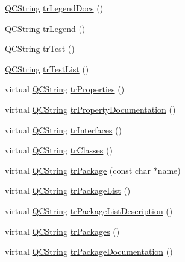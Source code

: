 \begin{DoxyCompactItemize}
\mbox{\hyperlink{class_q_c_string}{Q\+C\+String}} \mbox{\hyperlink{class_translator_polish_a0b2b7c31dea5cec7a2419404276e65f2}{tr\+Legend\+Docs}} ()
\item 
\mbox{\hyperlink{class_q_c_string}{Q\+C\+String}} \mbox{\hyperlink{class_translator_polish_aab45a1ee516e7e1bccfc3d583bfb4ab1}{tr\+Legend}} ()
\item 
\mbox{\hyperlink{class_q_c_string}{Q\+C\+String}} \mbox{\hyperlink{class_translator_polish_aad254fed5e66326eb597796325207be8}{tr\+Test}} ()
\item 
\mbox{\hyperlink{class_q_c_string}{Q\+C\+String}} \mbox{\hyperlink{class_translator_polish_ab08b331b46f12531653bd2933328c57a}{tr\+Test\+List}} ()
\item 
virtual \mbox{\hyperlink{class_q_c_string}{Q\+C\+String}} \mbox{\hyperlink{class_translator_polish_a6f0eb5ca63099a11f7117e427760efb7}{tr\+Properties}} ()
\item 
virtual \mbox{\hyperlink{class_q_c_string}{Q\+C\+String}} \mbox{\hyperlink{class_translator_polish_ab646ef6a01416499a16c0324f0174638}{tr\+Property\+Documentation}} ()
\item 
virtual \mbox{\hyperlink{class_q_c_string}{Q\+C\+String}} \mbox{\hyperlink{class_translator_polish_a9e7ec9037ad79c76607b29fc953bc6e5}{tr\+Interfaces}} ()
\item 
virtual \mbox{\hyperlink{class_q_c_string}{Q\+C\+String}} \mbox{\hyperlink{class_translator_polish_addab87a21d11341baa38eabe20b70507}{tr\+Classes}} ()
\item 
virtual \mbox{\hyperlink{class_q_c_string}{Q\+C\+String}} \mbox{\hyperlink{class_translator_polish_a90be77db4f73def98c3e2b462c505500}{tr\+Package}} (const char $\ast$name)
\item 
virtual \mbox{\hyperlink{class_q_c_string}{Q\+C\+String}} \mbox{\hyperlink{class_translator_polish_a73e66fde6e101c7206ad85184ae8550b}{tr\+Package\+List}} ()
\item 
virtual \mbox{\hyperlink{class_q_c_string}{Q\+C\+String}} \mbox{\hyperlink{class_translator_polish_afbbf97c720f6ffabd1beeebb00ec2433}{tr\+Package\+List\+Description}} ()
\item 
virtual \mbox{\hyperlink{class_q_c_string}{Q\+C\+String}} \mbox{\hyperlink{class_translator_polish_ace2118b22aaf21ebe135338d8b2b0b5e}{tr\+Packages}} ()
\item 
virtual \mbox{\hyperlink{class_q_c_string}{Q\+C\+String}} \mbox{\hyperlink{class_translator_polish_a2dd2abf2c2de10ab4169db92372d8237}{tr\+Package\+Documentation}} ()
\item 

\end{DoxyCompactItemize}
